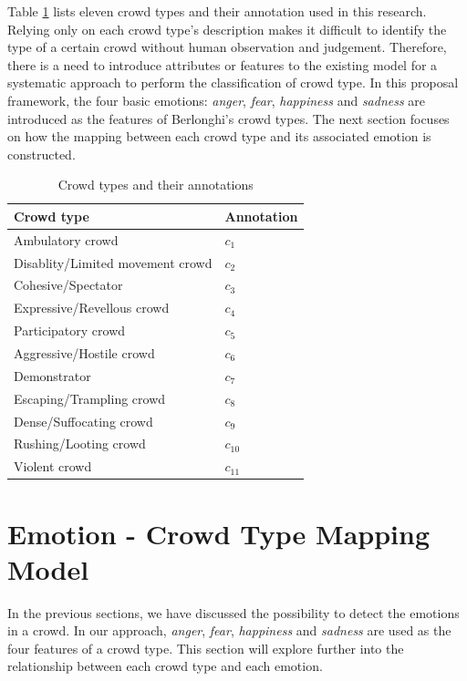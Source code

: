 Table \ref{table:crowdTypeAnnotation} lists eleven crowd types and their annotation used in this research. Relying only on each crowd type's description makes it difficult to identify the type of a certain crowd without human observation and judgement. Therefore, there is a need to introduce attributes or features to the existing model for a systematic approach to perform the classification of crowd type. In this proposal framework, the four basic emotions: \textit{anger}, \textit{fear}, \textit{happiness} and \textit{sadness} are introduced as the features of Berlonghi's crowd types. The next section focuses on how the mapping between each crowd type and its associated emotion is constructed.

\begin{table}
\caption{Crowd types and their annotations}
\label{table:crowdTypeAnnotation}
\centering
\begin{tabular}{|l|l|}
\hline
\textbf{Crowd type} & \textbf{Annotation} \\ \hline \hline
Ambulatory crowd & \(c_1\) \\ \hline
Disablity/Limited movement crowd & \(c_2\) \\ \hline
Cohesive/Spectator & \(c_3\) \\ \hline
Expressive/Revellous crowd & \(c_4\) \\ \hline
Participatory crowd & \(c_5\) \\ \hline
Aggressive/Hostile crowd & \(c_6\) \\ \hline
Demonstrator & \(c_7\) \\ \hline
Escaping/Trampling crowd & \(c_8\) \\ \hline
Dense/Suffocating crowd & \(c_9\) \\ \hline
Rushing/Looting crowd & \(c_{10}\) \\ \hline
Violent crowd & \(c_{11}\) \\ \hline
\end{tabular}
\end{table}

\section{Emotion - Crowd Type Mapping Model}
In the previous sections, we have discussed the possibility to detect the emotions in a crowd. In our approach, \textit{anger}, \textit{fear}, \textit{happiness} and \textit{sadness} are used as the four features of a crowd type. This section will explore further into the relationship between each crowd type and each emotion. 

